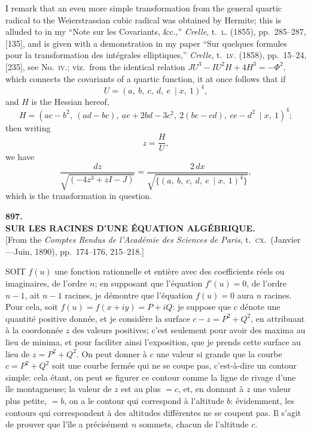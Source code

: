 \documentclass[11pt,a4paper]{article}
\begin{document}
I remark that an even more simple transformation from the general quartic radical to the Weierstrassian cubic radical was obtained by Hermite; this is alluded to in my ``Note sur les Covariants, \&c.,'' \emph{Crelle}, t.\ \textsc{l}. (1855), pp.\ 285--287, [135], and is given with a demonstration in my paper ``Sur quelques formules pour la transformation des intégrales elliptiques,'' \emph{Crelle}, t.\ \textsc{lv}. (1858), pp.\ 15--24, [235], see No.\ \textsc{iv}.; viz.\ from the identical relation $JU^3 - IU^2 H + 4H^3 = -\Phi^2$, which connects the covariants of a quartic function, it at once follows that if
\[
U = (a,\ b,\ c,\ d,\ e\:\!\mid x,\ 1)^4,
\]
and $H$ is the Hessian hereof,
\[
H = (ac - b^2,\ (ad - bc),\ ae + 2bd - 3c^2,\ 2(be - cd),\ ce - d^2\:\!\mid x,\ 1)^4;
\]
then writing
\[
z = \frac{H}{U},
\]
we have
\[
\frac{dz}{\sqrt{(-4z^3 + zI - J)}} = \frac{2\,dx}{\sqrt{\{(a,\ b,\ c,\ d,\ e\:\!\mid x,\ 1)^4\}}},
\]
which is the transformation in question.

\clearpage

\begin{center}
{\large\bfseries 897.}\\[0.5em]
{\large\bfseries SUR LES RACINES D'UNE \'EQUATION ALG\'EBRIQUE.}\\[0.5em]
\small [From the \emph{Comptes Rendus de l'Acad\'emie des Sciences de Paris}, t.\ \textsc{cx}.\ (Janvier---Juin, 1890), pp.\ 174--176, 215--218.]
\end{center}
\medskip

\noindent SOIT $f(u)$ une fonction rationnelle et entière avec des coefficients réels ou imaginaires, de l'ordre $n$; en supposant que l'équation $f'(u) = 0$, de l'ordre $n - 1$, ait $n - 1$ racines, je démontre que l'équation $f(u) = 0$ aura $n$ racines. Pour cela, soit $f(u) = f(x + iy) = P + iQ$: je suppose que $c$ dénote une quantité positive donnée, et je considère la surface $c - z = P^2 + Q^2$, en attribuant à la coordonnée $z$ des valeurs positives; c'est seulement pour avoir des maxima au lieu de minima, et pour faciliter ainsi l'exposition, que je prends cette surface au lieu de $z = P^2 + Q^2$. On peut donner à $c$ une valeur si grande que la courbe $c = P^2 + Q^2$ soit une courbe fermée qui ne se coupe pas, c'est-à-dire un contour simple: cela étant, on peut se figurer ce contour comme la ligne de rivage d'une île montagneuse; la valeur de $z$ est au plus $= c$, et, en donnant à $z$ une valeur plus petite, $= b$, on a le contour qui correspond à l'altitude $b$: évidemment, les contours qui correspondent à des altitudes différentes ne se coupent pas. Il s'agit de prouver que l'île a précisément $n$ sommets, chacun de l'altitude $c$.
\end{document}
